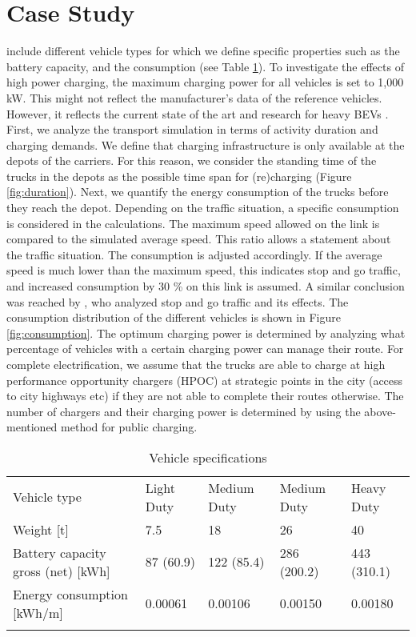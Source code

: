 \documentclass[3p,times,procedia]{elsarticle}
\begin{document}
\section{Case Study}
\label{casestudy}
\citet{MartinsturnerEtAl2020ETrucksFoodABMTrans} include different vehicle types for which we define specific properties such as the battery capacity, and the consumption (see  Table \ref{tab:specs}). To investigate the effects of high power charging, the maximum charging power for all vehicles is set to 1,000 kW. This might not reflect the manufacturer's data of the reference vehicles. However, it reflects the current state of the art and research for heavy BEVs \cite{Zhu.21720202202020}. First, we analyze the transport simulation in terms of activity duration and charging demands. We define that charging infrastructure is only available at the depots of the carriers. For this reason, we consider the standing time of the trucks in the depots as the possible time span for (re)charging (Figure \ref{fig:duration}). Next, we quantify the energy consumption of the trucks before they reach the depot.  Depending on the traffic situation, a specific consumption is considered in the calculations. The maximum speed allowed on the link is compared to the simulated average speed. This ratio allows a statement about the traffic situation. The consumption is adjusted accordingly. If the average speed is much lower than the maximum speed, this indicates stop and go traffic, and increased consumption by 30 \% on this link is assumed. A similar conclusion was reached by \citet{Li.2014}, who analyzed stop and go traffic and its effects. The consumption distribution of the different vehicles is shown in Figure \ref{fig:consumption}. The optimum charging power is determined by analyzing what percentage of vehicles with a certain charging power can manage their route. For complete electrification, we assume that the trucks are able to charge at high performance opportunity chargers (HPOC) at strategic points in the city (access to city highways etc) if they are not able to complete their routes otherwise. The number of chargers and their charging power is determined by using the above-mentioned method for public charging.
\begin{table}[ht]
\caption{Vehicle specifications \cite{MartinsturnerEtAl2020ETrucksFoodABMTrans}}
\begin{tabular*}{\hsize}{@{\extracolsep{\fill}}lllll@{}}
\toprule
Vehicle type & Light Duty & Medium Duty & Medium Duty & Heavy Duty\\
\colrule
Weight [t] &  7.5   &   18  &  26  &  40\\
Battery capacity gross (net) [kWh]  &  87 (60.9)   &   122 (85.4)  &  286 (200.2)  &  443 (310.1)\\
Energy consumption [kWh/m] &  0.00061   &   0.00106  &  0.00150  & 0.00180\\
\botrule
\label{tab:specs}
\end{tabular*}
\end{table}
\end{document}
